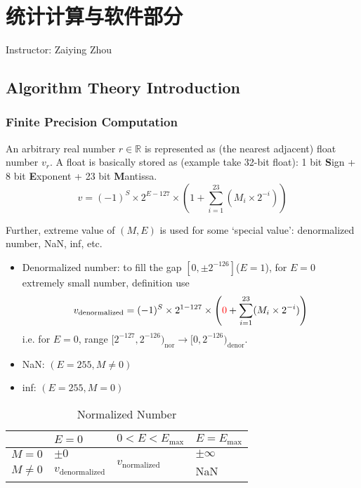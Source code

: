 \chapter{统计计算与软件部分}\label{SecStatisticalComputingAndSoftware}
\begin{center}
    Instructor: Zaiying Zhou
\end{center}

\section{Algorithm Theory Introduction}


\subsection{Finite Precision Computation}
    An arbitrary real number $ r\in\mathbb{R} $ is represented as (the nearest adjacent) float number $ v_r $. A float is basically stored as (example take 32-bit float): 1 bit \textbf{S}ign + 8 bit \textbf{E}xponent + 23 bit \textbf{M}antissa.
\begin{equation}\label{EqaNormalizedFloat}
    v=(-1)^S\times 2^{E-127}\times \left(1+\sum_{i=1}^{23}(M_i\times 2^{-i})\right)
\end{equation}
    
    
    Further, extreme value of $ (M,E) $ is used for some `special value': denormalized number, NaN, inf, etc. 
\begin{itemize}[topsep=2pt,itemsep=0pt]
    \item Denormalized number: to fill the gap $ [0,\pm 2^{-126}] $($ E=1 $), for $ E=0 $ extremely small number, definition use 
    \begin{align}
        v_\mathrm{denormalized}=(-1)^S\times 2^{1-127}\times \left({\color{red}0}+\sum_{i=1}^{23}(M_i\times 2^{-i})\right)  
    \end{align}
    i.e. for $ E=0 $, range $ [2^{-127},2^{-126})_\mathrm{nor}\to [0,2^{-126})_\mathrm{denor} $.
    \item NaN: $ (E=255,M\neq 0) $
    \item inf: $ (E=255,M=0) $
\end{itemize}

\begin{table}[H]
    \centering
    \renewcommand\arraystretch{1.15}
    \begin{tabular}{clll}
        \hline
        &$ E=0 $&$ 0<E<E_{\mathrm{max} } $&$ E=E_{\mathrm{max} }  $\\
        \hline
        $ M=0 $&$ \pm 0 $&\multirow{2}{*}{$  v_\mathrm{normalized} $}&$ \pm\infty $\\
        $ M\neq 0 $&$  v_\mathrm{denormalized} $&&NaN\\
        \hline
    \end{tabular}
    \caption{Normalized Number}
    \label{}
\end{table}

